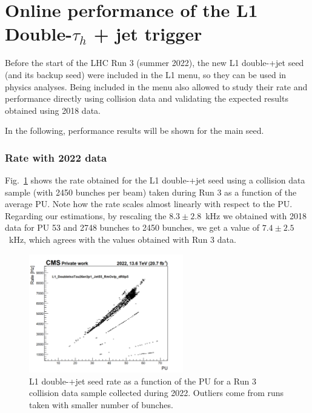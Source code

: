 \documentclass[../main.tex]{subfiles}
\begin{document}
\section{Online performance of the L1 Double-$\tau_h$ + jet trigger}

Before the start of the LHC Run 3 (summer 2022), the new L1 double-\tauh{}+jet seed (and its backup seed) were included in the L1 menu, so they can be used in physics analyses. Being included in the menu also allowed to study their rate and performance directly using collision data and validating the expected results obtained using 2018 data.

In the following, performance results will be shown for the main seed.

\subsubsection{Rate with 2022 data}

Fig.~\ref{hh:fig:l1_rate_run3} shows the rate obtained for the L1 double-\tauh{}+jet seed using a collision data sample (with 2450 bunches per beam) taken during Run 3 as a function of the average PU. Note how the rate scales almost linearly with respect to the PU. Regarding our estimations, by rescaling the $8.3\pm2.8$~kHz we obtained with 2018 data for PU 53 and 2748 bunches to 2450 bunches, we get a value of $7.4\pm2.5$~kHz, which agrees with the values obtained with Run 3 data.


\begin{figure}[h!]
\begin{center}
\includegraphics[width=0.6\textwidth]{Images/L1_rate}
\end{center}
\caption{L1 double-\tauh{}+jet seed rate as a function of the PU for a Run 3 collision data sample collected during 2022. Outliers come from runs taken with smaller number of bunches.}
\label{hh:fig:l1_rate_run3}
\end{figure}
\end{document}
